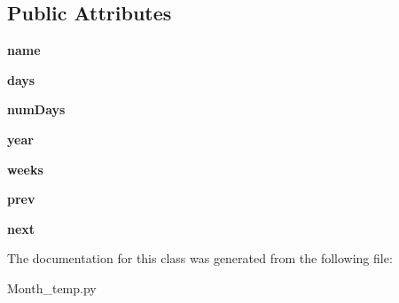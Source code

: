 \subsection*{Public Attributes}
\begin{DoxyCompactItemize}
\item 
{\bfseries name}\hypertarget{classapp_1_1Month__temp_1_1Month_af73168a9c7700462d3c0869159dcaf19}{}\label{classapp_1_1Month__temp_1_1Month_af73168a9c7700462d3c0869159dcaf19}

\item 
{\bfseries days}\hypertarget{classapp_1_1Month__temp_1_1Month_acf9b7e608c4e88b613460f892639cac6}{}\label{classapp_1_1Month__temp_1_1Month_acf9b7e608c4e88b613460f892639cac6}

\item 
{\bfseries num\+Days}\hypertarget{classapp_1_1Month__temp_1_1Month_a94470df462892ed6669e18dca87c5ab7}{}\label{classapp_1_1Month__temp_1_1Month_a94470df462892ed6669e18dca87c5ab7}

\item 
{\bfseries year}\hypertarget{classapp_1_1Month__temp_1_1Month_af2cc688492a8ecd1d6f16378f17e9b6f}{}\label{classapp_1_1Month__temp_1_1Month_af2cc688492a8ecd1d6f16378f17e9b6f}

\item 
{\bfseries weeks}\hypertarget{classapp_1_1Month__temp_1_1Month_af01e356983099270fd002056dbfee13f}{}\label{classapp_1_1Month__temp_1_1Month_af01e356983099270fd002056dbfee13f}

\item 
{\bfseries prev}\hypertarget{classapp_1_1Month__temp_1_1Month_a668a8b15f4f1b94f65b204806f5c84fe}{}\label{classapp_1_1Month__temp_1_1Month_a668a8b15f4f1b94f65b204806f5c84fe}

\item 
{\bfseries next}\hypertarget{classapp_1_1Month__temp_1_1Month_a2365362ffdc331fe389662cf0e1e9eb6}{}\label{classapp_1_1Month__temp_1_1Month_a2365362ffdc331fe389662cf0e1e9eb6}

\end{DoxyCompactItemize}


The documentation for this class was generated from the following file\+:\begin{DoxyCompactItemize}
\item 
Month\+\_\+temp.\+py\end{DoxyCompactItemize}
